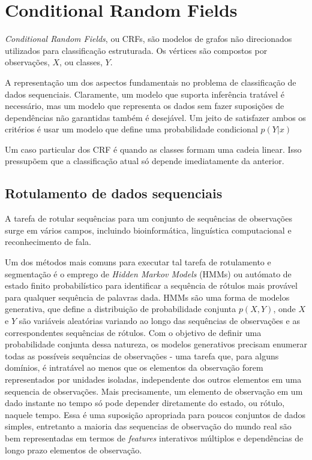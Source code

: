 \section{Conditional Random Fields}

\textit{Conditional Random Fields}, ou CRFs, são modelos de grafos não direcionados
utilizados para classificação estruturada. Os vértices são compostos por
observações, $X$, ou classes, $Y$.

A representação um dos aspectos fundamentais no problema de classificação de
dados sequenciais. Claramente, um modelo que suporta inferência tratável é
necessário, mas um modelo que representa os dados sem fazer suposições de
dependências não garantidas também é desejável. Um jeito de satisfazer ambos
os critérios é usar um modelo que define uma probabilidade condicional
$p(Y|x)$

Um caso particular dos CRF é quando as classes formam uma cadeia linear.
Isso pressupõem que a classificação atual só depende imediatamente da
anterior.

%
%

\subsection{Rotulamento de dados sequenciais}

A tarefa de rotular sequências para um conjunto de sequências de observações
surge em vários campos, incluindo bioinformática, linguística computacional
e reconhecimento de fala.

Um dos métodos mais comuns para executar tal tarefa de rotulamento e segmentação
é o emprego de \textit{Hidden Markov Models} (HMMs) ou autómato de estado finito
probabilístico para identificar a sequência de rótulos mais provável para qualquer
sequência de palavras dada. HMMs são uma forma de modelos generativa, que define
a distribuição de probabilidade conjunta $p(X,Y)$, onde $X$ e $Y$ são variáveis
aleatórias variando ao longo das sequências de observações e as correspondentes
sequências de rótulos. Com o objetivo de definir uma probabilidade conjunta dessa
natureza, os modelos generativos precisam enumerar todas as possíveis sequências de
observações - uma tarefa que, para alguns domínios, é intratável ao menos que os
elementos da observação forem representados por unidades isoladas, independente dos
outros elementos em uma sequencia de observações. Mais precisamente, um elemento
de observação em um dado instante no tempo só pode depender diretamente do estado,
ou rótulo, naquele tempo. Essa é uma suposição apropriada para poucos conjuntos de
dados simples, entretanto a maioria das sequencias de observação do mundo real são
bem representadas em termos de \textit{features} interativos múltiplos e dependências
de longo prazo elementos de observação.

